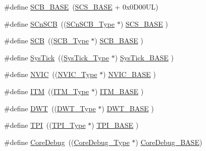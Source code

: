 \begin{DoxyCompactItemize}
\item 
\#define \hyperlink{group___c_m_s_i_s__core__base_gad55a7ddb8d4b2398b0c1cfec76c0d9fd}{S\+C\+B\+\_\+\+B\+A\+SE}~(\hyperlink{group___c_m_s_i_s__core__base_ga3c14ed93192c8d9143322bbf77ebf770}{S\+C\+S\+\_\+\+B\+A\+SE} +  0x0\+D00\+U\+L)
\item 
\#define \hyperlink{group___c_m_s_i_s__core__base_ga9fe0cd2eef83a8adad94490d9ecca63f}{S\+Cn\+S\+CB}~((\hyperlink{struct_s_cn_s_c_b___type}{S\+Cn\+S\+C\+B\+\_\+\+Type}    $\ast$)     \hyperlink{group___c_m_s_i_s__core__base_ga3c14ed93192c8d9143322bbf77ebf770}{S\+C\+S\+\_\+\+B\+A\+SE}      )
\item 
\#define \hyperlink{group___c_m_s_i_s__core__base_gaaaf6477c2bde2f00f99e3c2fd1060b01}{S\+CB}~((\hyperlink{struct_s_c_b___type}{S\+C\+B\+\_\+\+Type}       $\ast$)     \hyperlink{group___c_m_s_i_s__core__base_gad55a7ddb8d4b2398b0c1cfec76c0d9fd}{S\+C\+B\+\_\+\+B\+A\+SE}      )
\item 
\#define \hyperlink{group___c_m_s_i_s__core__base_gacd96c53beeaff8f603fcda425eb295de}{Sys\+Tick}~((\hyperlink{struct_sys_tick___type}{Sys\+Tick\+\_\+\+Type}   $\ast$)     \hyperlink{group___c_m_s_i_s__core__base_ga58effaac0b93006b756d33209e814646}{Sys\+Tick\+\_\+\+B\+A\+SE}  )
\item 
\#define \hyperlink{group___c_m_s_i_s__core__base_gac8e97e8ce56ae9f57da1363a937f8a17}{N\+V\+IC}~((\hyperlink{struct_n_v_i_c___type}{N\+V\+I\+C\+\_\+\+Type}      $\ast$)     \hyperlink{group___c_m_s_i_s__core__base_gaa0288691785a5f868238e0468b39523d}{N\+V\+I\+C\+\_\+\+B\+A\+SE}     )
\item 
\#define \hyperlink{group___c_m_s_i_s__core__base_gabae7cdf882def602cb787bb039ff6a43}{I\+TM}~((\hyperlink{struct_i_t_m___type}{I\+T\+M\+\_\+\+Type}       $\ast$)     \hyperlink{group___c_m_s_i_s__core__base_gadd76251e412a195ec0a8f47227a8359e}{I\+T\+M\+\_\+\+B\+A\+SE}      )
\item 
\#define \hyperlink{group___c_m_s_i_s__core__base_gabbe5a060185e1d5afa3f85b14e10a6ce}{D\+WT}~((\hyperlink{struct_d_w_t___type}{D\+W\+T\+\_\+\+Type}       $\ast$)     \hyperlink{group___c_m_s_i_s__core__base_gafdab534f961bf8935eb456cb7700dcd2}{D\+W\+T\+\_\+\+B\+A\+SE}      )
\item 
\#define \hyperlink{group___c_m_s_i_s__core__base_ga8b4dd00016aed25a0ea54e9a9acd1239}{T\+PI}~((\hyperlink{struct_t_p_i___type}{T\+P\+I\+\_\+\+Type}       $\ast$)     \hyperlink{group___c_m_s_i_s__core__base_ga2b1eeff850a7e418844ca847145a1a68}{T\+P\+I\+\_\+\+B\+A\+SE}      )
\item 
\#define \hyperlink{group___c_m_s_i_s__core__base_gab6e30a2b802d9021619dbb0be7f5d63d}{Core\+Debug}~((\hyperlink{struct_core_debug___type}{Core\+Debug\+\_\+\+Type} $\ast$)     \hyperlink{group___c_m_s_i_s__core__base_ga680604dbcda9e9b31a1639fcffe5230b}{Core\+Debug\+\_\+\+B\+A\+SE})
\end{DoxyCompactItemize}


